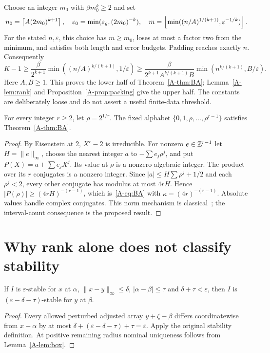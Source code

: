 Choose an integer $m_0$ with $\beta m_0^k\ge2$ and set
\begin{equation}\label{A-eq:quantifiers}
n_0=\left\lceil A(2m_0)^{k+1}\right\rceil,\quad
\varepsilon_0=\min(\varepsilon_g,(2m_0)^{-k}),\quad
m=\left\lfloor \min((n/A)^{1/(k+1)},\varepsilon^{-1/k})\right\rfloor.
\end{equation}
For the stated $n,\varepsilon$, this choice has $m\ge m_0$, loses at most a factor two from the minimum, and satisfies both length and error budgets. Padding reaches exactly $n$. Consequently
\begin{equation}\label{A-eq:lower}
K-1\ge\frac{\beta}{2^{k+1}}\min((n/A)^{k/(k+1)},1/\varepsilon)
\ge\frac{\beta}{2^{k+1}A^{k/(k+1)}B}\min(n^{k/(k+1)},B/\varepsilon).
\end{equation}
Here $A,B\ge1$. This proves the lower half of Theorem~\ref{A-thm:BA}; Lemma~\ref{A-lem:rank} and Proposition~\ref{A-prop:packing} give the upper half. The constants are deliberately loose and do not assert a useful finite-data threshold.

\begin{corollary}\label{A-cor:algebraic}
For every integer $r\ge2$, let $\rho=2^{1/r}$. The fixed alphabet $\{0,1,\rho,\ldots,\rho^{r-1}\}$ satisfies Theorem~\ref{A-thm:BA}.
\end{corollary}
\begin{proof}
By Eisenstein at 2, $X^r-2$ is irreducible. For nonzero $e\in\mathbb Z^{r-1}$ let $H=\|e\|_\infty$, choose the nearest integer $a$ to $-\sum e_j\rho^j$, and put $P(X)=a+\sum e_jX^j$. Its value at $\rho$ is a nonzero algebraic integer. The product over its $r$ conjugates is a nonzero integer. Since $|a|\le H\sum\rho^j+1/2$ and each $\rho^j<2$, every other conjugate has modulus at most $4rH$. Hence $|P(\rho)|\ge(4rH)^{-(r-1)}$, which is~\eqref{A-eq:BA} with $\kappa=(4r)^{-(r-1)}$. Absolute values handle complex conjugates. This norm mechanism is classical~\cite{fgm}; the interval-count consequence is the proposed result.
\end{proof}

\section{Why rank alone does not classify stability}
\begin{lemma}\label{A-lem:transfer}
If $I$ is $\varepsilon$-stable for $x$ at $\alpha$, $\|x-y\|_\infty\le\delta$, $|\alpha-\beta|\le\tau$ and $\delta+\tau<\varepsilon$, then $I$ is $(\varepsilon-\delta-\tau)$-stable for $y$ at $\beta$.
\end{lemma}
\begin{proof}
Every allowed perturbed adjusted array $y+\zeta-\beta$ differs coordinatewise from $x-\alpha$ by at most $\delta+(\varepsilon-\delta-\tau)+\tau=\varepsilon$. Apply the original stability definition. At positive remaining radius nominal uniqueness follows from Lemma~\ref{A-lem:box}.
\end{proof}


